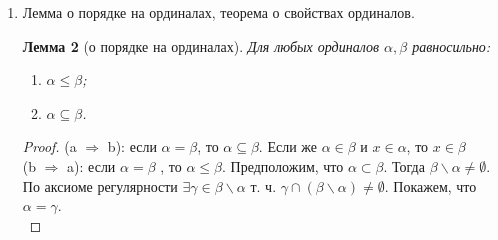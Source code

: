 \documentclass[a4paper]{article}
\newtheorem*{lemma*}{Лемма}
\theoremstyle{definition}
\newtheorem*{definition*}{Определение}
\begin{document}
\begin{enumerate}
\begin{definition*}[Ординал]
        Ординалом называется транзитивное множество все элементы которого сравнимы относительно включения.
       \end{definition*}
       \begin{definition*}[Транзитивное множество]
        Множество $\alpha$ называется транзитивным, если из $x \in \alpha $ и $y \in x $ следует, что  $x \in \alpha $.
       \end{definition*}
       \begin{lemma*}[Лемма об элементах ординала]
        Если $\alpha$ - ординал и $\beta \in \alpha$, то $\beta$ - ординал.
       \end{lemma*}
       \begin{proof}
        Пусть $x,y\in \beta$. Тогда $x,y\in \alpha$. Следовательно, $x$ и $y$ равны или сравнимы относительно $\in$. Докажем, что $\beta$ транзитивно. Пусть $y \in x \in \beta$. Тогда $x \in \alpha$ и $y \in \alpha$. Возможны три случая:
        \begin{enumerate}
         \item $\beta \in y$ Тогда получаем, что $\beta \in y \in x \in \beta$ - противоречие.
         \item $\beta = y$ Получаем, что $\beta \in x \in \beta$ - противоречие.
         \item $y \in \beta$.
               Следовательно, $\beta$ - ординал.
        \end{enumerate}
       \end{proof}
 \item Лемма о порядке на ординалах, теорема о свойствах ординалов.
       \begin{lemma*}[о порядке на ординалах]
        Для любых ординалов $\alpha, \beta$ равносильно:
        \begin{enumerate}
         \item $\alpha \leq \beta$;
         \item $\alpha \subseteq \beta$.
        \end{enumerate}
       \end{lemma*}
       \begin{proof}
        (a $\Rightarrow$ b): если $\alpha = \beta$, то $\alpha \subseteq \beta$. Если же $\alpha \in \beta$ и $x \in \alpha$, то $x \in\beta$\\
        (b $\Rightarrow$ a): если $\alpha = \beta$ , то $\alpha \leq \beta$. Предположим, что $\alpha \subset \beta$. Тогда $\beta \backslash \alpha \neq \emptyset$. По аксиоме регулярности $\exists \gamma \in \beta \backslash \alpha$ т. ч. $\gamma \cap (\beta \backslash \alpha) \neq \emptyset$. Покажем, что $\alpha = \gamma$. \\

\end{proof}
\end{enumerate}
\end{document}
